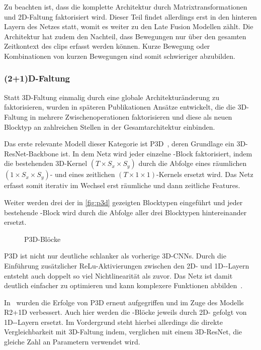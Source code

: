 Zu beachten ist, dass die komplette Architektur durch Matrixtransformationen und 2D-Faltung faktorisiert wird.
Dieser Teil findet allerdings erst in den hinteren Layern des Netzes statt, womit es weiter zu den Late Fusion Modellen zählt.
Die Architektur hat zudem den Nachteil, dass Bewegungen nur über den gesamten Zeitkontext des \glspl{clip} erfasst werden können.
Kurze Bewegung oder Kombinationen von kurzen Bewegungen sind somit schwieriger abzubilden.

\subsubsection{(2+1)D-Faltung}

Statt 3D-Faltung einmalig durch eine globale Architekturänderung zu faktorisieren, wurden in späteren Publikationen Ansätze entwickelt, die die 3D-Faltung in mehrere Zwischenoperationen faktorisieren und diese als neuen Blocktyp an zahlreichen Stellen in der Gesamtarchitektur einbinden.

Das erste relevante Modell dieser Kategorie ist P3D~\cite{Qiu17}, deren Grundlage ein 3D-ResNet-Backbone ist.
In dem Netz wird jeder einzelne \res-Block faktorisiert, indem die bestehenden 3D-Kernel $(T \times S_x \times S_y)$ durch die Abfolge eines räumlichen $(1 \times S_x \times S_y)$- und eines zeitlichen $(T \times 1 \times 1)$-Kernels ersetzt wird.
Das Netz erfasst somit iterativ im Wechsel erst räumliche und dann zeitliche Features.

Weiter werden drei der in \autoref{fig:p3d} gezeigten Blocktypen eingeführt und jeder bestehende \res-Block wird durch die Abfolge aller drei Blocktypen hintereinander ersetzt.

\begin{figure}[h!]
    \centering
    \caption{P3D-Blöcke}
    \label{fig:p3d}
\end{figure}

P3D ist nicht nur deutliche schlanker als vorherige 3D-CNNs.
Durch die Einführung zusätzlicher ReLu-Aktivierungen zwischen den 2D- und 1D-\conv-Layern entsteht auch doppelt so viel Nichtlinearität als zuvor.
Das Netz ist damit deutlich einfacher zu optimieren und kann komplexere Funktionen abbilden~\cite{Tran18}.

In~\cite{Tran18} wurden die Erfolge von P3D erneut aufgegriffen und im Zuge des Modells R2+1D verbessert.
Auch hier werden die \res-Blöcke jeweils durch 2D- gefolgt von 1D-\conv-Layern ersetzt.
Im Vordergrund steht hierbei allerdings die direkte Vergleichbarkeit mit 3D-Faltung indem, verglichen mit einem 3D-ResNet, die gleiche Zahl an Parametern verwendet wird.

